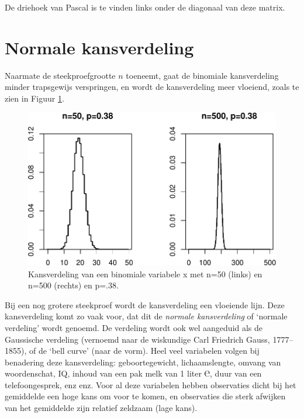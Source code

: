 \documentclass[
]{book}
\begin{document}
De driehoek van Pascal is te vinden links onder de diagonaal van deze matrix.

\hypertarget{sec:normaalverdeling}{%
\section{Normale kansverdeling}\label{sec:normaalverdeling}}

Naarmate de steekproefgrootte \(n\) toeneemt, gaat de binomiale
kansverdeling minder trapsgewijs verspringen, en wordt de kansverdeling
meer vloeiend, zoals te zien in
Figuur \ref{fig:binomkansverdeling50n500}.

\begin{figure}
\centering
\includegraphics{KMS-NL_files/figure-latex/binomkansverdeling50n500-1.pdf}
\caption{\label{fig:binomkansverdeling50n500}Kansverdeling van een binomiale variabele x met n=50 (links) en n=500 (rechts) en p=.38.}
\end{figure}

Bij een nog grotere steekproef wordt de kansverdeling een vloeiende lijn.
Deze kansverdeling komt zo vaak voor, dat dit de \emph{normale kansverdeling}
of `normale verdeling' wordt genoemd. De verdeling wordt ook wel
aangeduid als de Gaussische verdeling (vernoemd naar de wiskundige Carl
Friedrich Gauss, 1777--1855), of de `bell curve' (naar de vorm). Heel
veel variabelen volgen bij benadering deze kansverdeling:
geboortegewicht, lichaamslengte, omvang van woordenschat, IQ, inhoud van
een pak melk van 1 liter ℮, duur van een telefoongesprek, enz enz. Voor
al deze variabelen hebben observaties dicht bij het gemiddelde een hoge
kans om voor te komen, en observaties die sterk afwijken van het
gemiddelde zijn relatief zeldzaam (lage kans).
\end{document}
